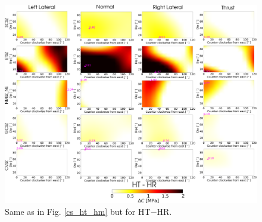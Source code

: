 \documentclass[draft,linenumbers]{agujournal2018}
\begin{document}
%
\begin{figure}[ht]
    \centering
    \includegraphics[width=\linewidth]{figures/ht_hr_summ.png}
    \caption{Same as in Fig. \ref{cs_ht_hm} but for HT$-$HR.}
    \label{cs_ht_hr}
\end{figure}
\end{document}
